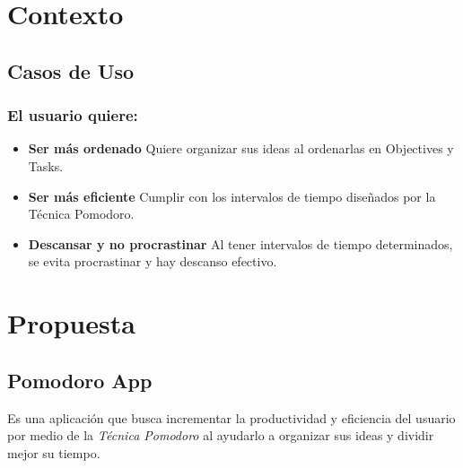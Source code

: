 \documentclass[]{article}
\begin{document}
\section{Contexto}
\subsection{Casos de Uso}
\subsubsection{El usuario quiere:}
\begin{itemize}
	\item \textbf{Ser más ordenado}
	\subitem Quiere organizar sus ideas al ordenarlas en Objectives y Tasks.
	\item \textbf{Ser más eficiente}
	\subitem Cumplir con los intervalos de tiempo diseñados por la Técnica Pomodoro.
	\item \textbf{Descansar y no procrastinar}
	\subitem Al tener intervalos de tiempo determinados, se evita procrastinar y hay descanso efectivo.
\end{itemize}
	
\section{Propuesta}
\subsection{Pomodoro App}
\par Es una aplicación que busca incrementar la productividad y eficiencia del usuario por medio de la \textit{Técnica Pomodoro} al ayudarlo a organizar sus ideas y dividir mejor su tiempo.
\end{document}
